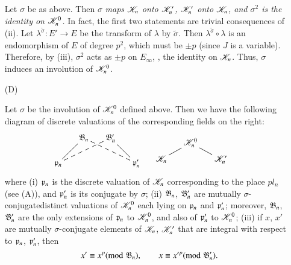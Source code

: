 \begin{itemize}
Let $\sigma$ be as above. Then $\sigma$ \textit{maps $\mathscr{K}_n$ onto $\mathscr{K}'_n$, $\mathscr{K}'_n$ onto $\mathscr{K}_n$, and $\sigma^2$ is the identity on $\mathscr{K}^0_n$.} In fact, the first two statements are trivial consequences of (ii). Let $\lambda^{\tilde{\sigma}} : E' \to E$ be the transform of $\lambda$ by $\tilde{\sigma}$. Then $\lambda^{\tilde{\sigma}} \circ \lambda$ is an endomorphism of $E$ of degree $p^2$, which must be $\pm p$ (since $J$ is a variable). Therefore, by (iii), $\sigma^2$ acts as $\pm p$ on $E_\infty$, \ie, the identity on $\mathscr{K}_n$. Thus, $\sigma$ induces an involution of $\mathscr{K}^0_n$.

\item[(D)]\begin{subprop}\label{art6-subprop5.2.4}
Let $\sigma$ be the involution of $\mathscr{K}^0_n$ defined above. Then we have the following diagram of discrete valuations of the corresponding fields on the right:
\begin{equation}
\vcenter{
\xymatrix@R=0.5cm@C=0.5cm{
& \fB_n \ar@{-}[dl] \ar@{--}[drr] & \fB'_n \ar@{-}[dr] \ar@{--}[dll] & \\
\fp_n & & & \fp'_n
}}
\quad\;
\vcenter{
\xymatrix@R=-0.05cm@C=0.5cm{
& \sK^0_n \ar@{-}[ddr]\ar@{-}[ddl]& \\
& & & \\
\sK_n && \sK'_n
}}
\label{art6-eq5.2.5}
\end{equation}
where (i) $\mathfrak{p}_n$ is the discrete valuation of $\mathscr{K}_n$ corresponding to the place $pl_n$ (see (A)), and $\mathfrak{p}'_n$ is its conjugate by $\sigma$; (ii) $\mathfrak{B}_n$, $\mathfrak{B}'_n$ are mutually $\sigma$-conjugate\pageoriginale distinct valuations of $\mathscr{K}^0_n$ each lying on $\mathfrak{p}_n$ and $\mathfrak{p}'_n$; moreover, $\mathfrak{B}_n$, $\mathfrak{B}'_n$ are the only extensions of $\mathfrak{p}_n$ to $\mathscr{K}^0_n$, and also of $\mathfrak{p}'_n$ to $\mathscr{K}^0_n$; (iii) if $x$, $x'$ are mutually $\sigma$-conjugate elements of $\mathscr{K}_n$, $\mathscr{K}'_n$ that are integral with respect to $\mathfrak{p}_n$, $\mathfrak{p}'_n$, then
\begin{equation}
x'  \equiv x^p ({\rm{mod}}\kern.3em \mathfrak{B}_n), \qquad  x \equiv x'^p ({\rm{mod}}\kern.3em \mathfrak{B}'_n) . 
\label{art6-eq5.2.6}
\end{equation}
\end{subprop}


\end{itemize}
